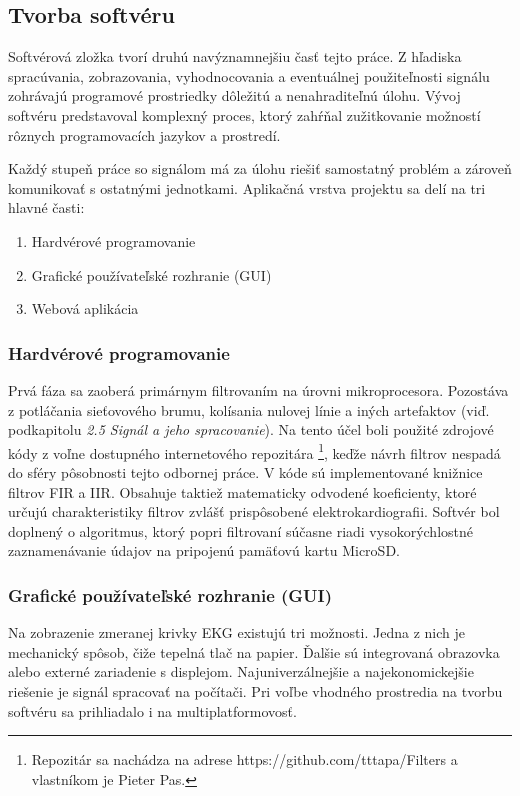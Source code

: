 \documentclass[titlepage,12pt]{article}
\begin{document}
\newpage
\subsection{Tvorba softvéru}
Softvérová zložka tvorí druhú navýznamnejšiu časť tejto práce. Z hľadiska spracúvania, zobrazovania, vyhodnocovania a eventuálnej použiteľnosti signálu zohrávajú programové prostriedky dôležitú a nenahraditeľnú úlohu. Vývoj softvéru predstavoval komplexný proces, ktorý zahŕňal zužitkovanie možností rôznych programovacích jazykov a prostredí.

Každý stupeň práce so signálom má za úlohu riešiť samostatný problém a zároveň komunikovať s ostatnými jednotkami. Aplikačná vrstva projektu sa delí na tri hlavné časti:
\begin{enumerate}
	\item Hardvérové programovanie
	\item Grafické používateľské rozhranie (GUI)
	\item Webová aplikácia
\end{enumerate}

\subsubsection{Hardvérové programovanie}
Prvá fáza sa zaoberá primárnym filtrovaním na úrovni mikroprocesora. Pozostáva z potláčania sieťovového brumu, kolísania nulovej línie a iných artefaktov (viď. podkapitolu \textit{2.5 Signál \linebreak a jeho spracovanie}). Na tento účel boli použité zdrojové kódy z voľne dostupného internetového repozitára \footnote{Repozitár sa nachádza na adrese https://github.com/tttapa/Filters a vlastníkom je Pieter Pas.}, keďže návrh filtrov nespadá do sféry pôsobnosti tejto odbornej práce. V kóde sú implementované knižnice filtrov FIR a IIR. Obsahuje taktiež matematicky odvodené koeficienty, ktoré určujú charakteristiky filtrov zvlášť prispôsobené elektrokardiografii. Softvér bol doplnený o algoritmus, ktorý popri filtrovaní súčasne riadi vysokorýchlostné zaznamenávanie údajov na pripojenú pamäťovú kartu MicroSD.

\subsubsection{Grafické používateľské rozhranie (GUI)}
Na zobrazenie zmeranej krivky EKG existujú tri možnosti. Jedna z nich je mechanický spôsob, čiže tepelná tlač na papier. Ďalšie sú integrovaná obrazovka alebo externé zariadenie s displejom. Najuniverzálnejšie a najekonomickejšie riešenie je signál spracovať na počítači. Pri voľbe vhodného prostredia na tvorbu softvéru sa prihliadalo i na multiplatformovosť.
\end{document}
